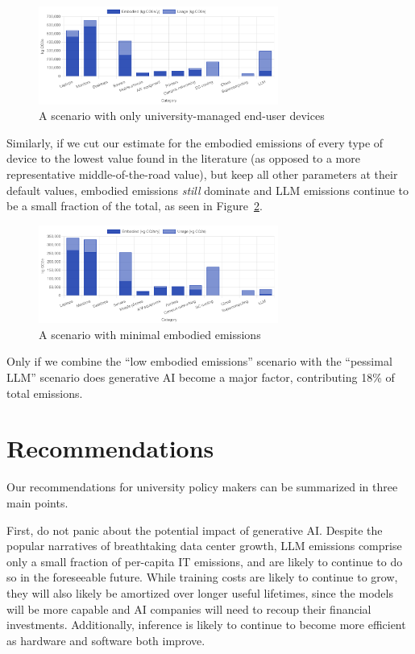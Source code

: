 \documentclass[11pt]{article}
\begin{document}
\begin{figure}[h]
  \centering
  \includegraphics[width=0.7\textwidth]{fig-sens1.png}
  \caption{A scenario with only university-managed end-user devices}
  \label{fig:sens1}
\end{figure}

Similarly, if we cut our estimate for the embodied emissions of every type of device to the lowest value found in the literature (as opposed to a more representative middle-of-the-road value), but keep all other parameters at their default values, embodied emissions {\em still} dominate and LLM emissions continue to be a small fraction of the total, as seen in Figure~\ref{fig:sens2}.

\begin{figure}[h]
  \centering
  \includegraphics[width=0.7\textwidth]{fig-sens2.png}
  \caption{A scenario with minimal embodied emissions}
  \label{fig:sens2}
\end{figure}

Only if we combine the ``low embodied emissions'' scenario with the ``pessimal LLM'' scenario does generative AI become a major factor, contributing 18\% of total emissions.

\section{Recommendations}
\label{sec:recommendations}

Our recommendations for university policy makers can be summarized in three main points.

First, do not panic about the potential impact of generative AI. Despite the popular narratives of breathtaking data center growth, LLM emissions comprise only a small fraction of per-capita IT emissions, and are likely to continue to do so in the foreseeable future. While training costs are likely to continue to grow, they will also likely be amortized over longer useful lifetimes, since the models will be more capable and AI companies will need to recoup their financial investments. Additionally, inference is likely to continue to become more efficient as hardware and software both improve.
\end{document}
